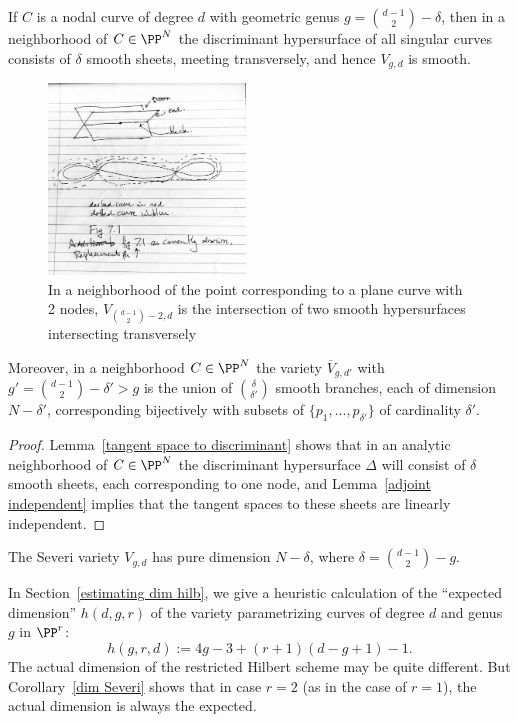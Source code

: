\begin{corollary}\label{local geometry of Severi}
If $C$ is a nodal curve of degree $d$ with geometric genus $g = \binom{d-1}{2}-\delta$, then in a neighborhood of $C\in \PP^N$
the discriminant hypersurface of all singular curves consists of $\delta$ smooth sheets, meeting transversely, and hence
$V_{g,d}$ is smooth. 

\begin{figure}
 \caption{In a neighborhood of the point corresponding to a plane curve with 2 nodes, $V_{\binom{d-1}{2}-2, d}$ is the intersection of two smooth hypersurfaces intersecting transversely}
\centerline {\includegraphics[height=2in]{"Fig6.3a.pdf"}}
\end{figure}

Moreover, in a neighborhood  $C \in \PP^N$ 
the variety $\overline V_{g,d'}$ with $g' =  \binom{d-1}{2}-\delta' > g$ is the union of $\binom{\delta}{\delta'}$ smooth branches, each of dimension $N - \delta'$, corresponding bijectively with subsets of $\{p_1,\dots,p_{\delta'}\}$ of cardinality $\delta'$.
\end{corollary}
\begin{proof}
Lemma~\ref{tangent space to discriminant} shows that in an analytic neighborhood of $C\in \PP^N$ the discriminant hypersurface $\Delta$ will consist of $\delta$ smooth sheets, each corresponding to one node, and Lemma~\ref{adjoint independent} implies that the tangent spaces to these sheets are linearly independent. 
\end{proof}


\begin{corollary}\label{dim Severi}
The  Severi variety $V_{g,d}$ has pure dimension $N - \delta$, where $\delta = \binom{d-1}{2} - g$.
\end{corollary}

In Section~\ref{estimating dim hilb}, we give a heuristic calculation of the ``expected dimension'' $h(d,g,r)$ of the variety parametrizing curves of degree $d$ and genus $g$ in $\PP^r$:
$$
h(g,r,d) := 4g-3 + (r+1)(d-g+1) - 1.
$$
The actual dimension of the restricted Hilbert scheme may be quite different. But  Corollary~\ref{dim Severi} shows that in case $r=2$ (as in the case of $r=1$), the actual dimension is always the expected.



